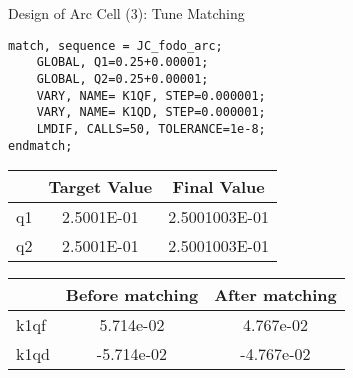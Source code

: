 \documentclass{beamer}
\begin{document}
\begin{frame}[t,fragile]{Design of Arc Cell (3): Tune Matching}
\begin{lstlisting}
match, sequence = JC_fodo_arc;
    GLOBAL, Q1=0.25+0.00001;
    GLOBAL, Q2=0.25+0.00001;
    VARY, NAME= K1QF, STEP=0.000001;
    VARY, NAME= K1QD, STEP=0.000001;
    LMDIF, CALLS=50, TOLERANCE=1e-8;
endmatch;
\end{lstlisting}

\begin{table}
\centering
\begin{tabularx}{0.6\textwidth}{lS[table-format=-1.4e-1]S[table-format=-1.4e-1]}
	\toprule
	  & {Target Value} & {Final Value}  \\ \midrule
	q1 & 2.5001E-01 & 2.5001003E-01 \\
	q2 & 2.5001E-01 & 2.5001003E-01 \\ \bottomrule
\end{tabularx}
\end{table}

\begin{table}
\centering
\begin{tabularx}{0.6\textwidth}{lS[table-format=-1.4e-1]S[table-format=-1.4e-1]}
	\toprule
	     & {Before matching} & {After matching} \\ \midrule
	k1qf & 5.714e-02       & 4.767e-02      \\
	k1qd & -5.714e-02      & -4.767e-02     \\ \bottomrule
\end{tabularx}
\end{table}
\end{frame}
\end{document}

